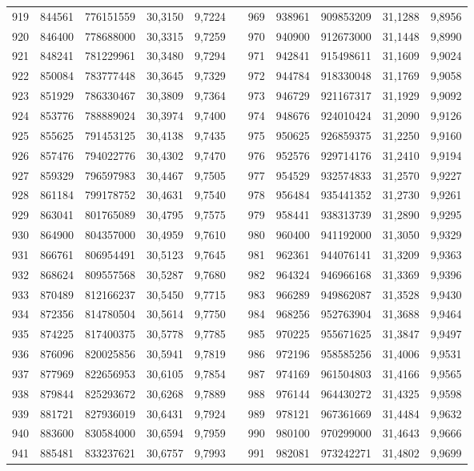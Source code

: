 \begin{longtable}{rrrrrrrrrrr}
919&844561&776151559&30,3150&9,7224&&969&938961&909853209&31,1288&9,8956\\
920&846400&778688000&30,3315&9,7259&&970&940900&912673000&31,1448&9,8990\\
921&848241&781229961&30,3480&9,7294&&971&942841&915498611&31,1609&9,9024\\
922&850084&783777448&30,3645&9,7329&&972&944784&918330048&31,1769&9,9058\\
923&851929&786330467&30,3809&9,7364&&973&946729&921167317&31,1929&9,9092\\
924&853776&788889024&30,3974&9,7400&&974&948676&924010424&31,2090&9,9126\\
925&855625&791453125&30,4138&9,7435&&975&950625&926859375&31,2250&9,9160\\
926&857476&794022776&30,4302&9,7470&&976&952576&929714176&31,2410&9,9194\\
927&859329&796597983&30,4467&9,7505&&977&954529&932574833&31,2570&9,9227\\
928&861184&799178752&30,4631&9,7540&&978&956484&935441352&31,2730&9,9261\\
929&863041&801765089&30,4795&9,7575&&979&958441&938313739&31,2890&9,9295\\
930&864900&804357000&30,4959&9,7610&&980&960400&941192000&31,3050&9,9329\\
931&866761&806954491&30,5123&9,7645&&981&962361&944076141&31,3209&9,9363\\
932&868624&809557568&30,5287&9,7680&&982&964324&946966168&31,3369&9,9396\\
933&870489&812166237&30,5450&9,7715&&983&966289&949862087&31,3528&9,9430\\
934&872356&814780504&30,5614&9,7750&&984&968256&952763904&31,3688&9,9464\\
935&874225&817400375&30,5778&9,7785&&985&970225&955671625&31,3847&9,9497\\
936&876096&820025856&30,5941&9,7819&&986&972196&958585256&31,4006&9,9531\\
937&877969&822656953&30,6105&9,7854&&987&974169&961504803&31,4166&9,9565\\
938&879844&825293672&30,6268&9,7889&&988&976144&964430272&31,4325&9,9598\\
939&881721&827936019&30,6431&9,7924&&989&978121&967361669&31,4484&9,9632\\
940&883600&830584000&30,6594&9,7959&&990&980100&970299000&31,4643&9,9666\\
941&885481&833237621&30,6757&9,7993&&991&982081&973242271&31,4802&9,9699\\

\end{longtable}
